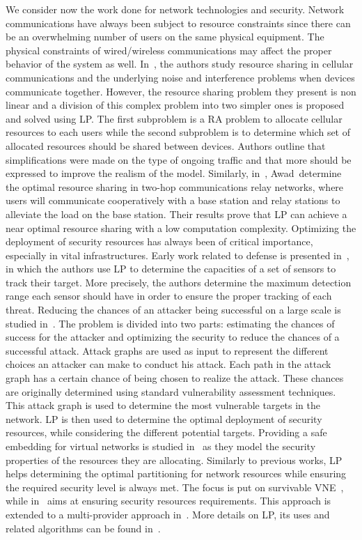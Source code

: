 We consider now the work done for network technologies and security. 
Network communications have always been subject to resource constraints since there can be an overwhelming number of users on the same physical equipment. 
The physical constraints of wired/wireless communications may affect the proper behavior of the system as well.
In~\cite{wirelessvirt-moubayed2015}, the authors study resource sharing in cellular communications and the underlying noise and interference problems when devices communicate together.
However, the resource sharing problem they present is non linear and a division of this complex problem into two simpler ones is proposed and solved using LP.
The first subproblem is a RA problem to allocate cellular resources to each users while the second subproblem is to determine which set of allocated resources should be shared between devices.
Authors outline that simplifications were made on the type of ongoing traffic and that more should be expressed to improve the realism of the model.
Similarly, in~\cite{ofdma-awad2008}, Awad~\etal determine the optimal resource sharing in two-hop communications relay networks, where users will communicate cooperatively with a base station and relay stations to alleviate the load on the base station. Their results prove that LP can achieve a near optimal resource sharing with a low computation complexity.
Optimizing the deployment of security resources has always been of critical importance, especially in vital infrastructures.
Early work related to defense is presented in~\cite{monitoring-nash1977}, in which the authors use LP to determine the capacities of a set of sensors to track their target. More precisely, the authors determine the maximum detection range each sensor should have in order to ensure the proper tracking of each threat. 
Reducing the chances of an attacker being successful on a large scale is studied in~\cite{Almohri2016}. The problem is divided into two parts: estimating the chances of success for the attacker and optimizing the security to reduce the chances of a successful attack.
Attack graphs are used as input to represent the different choices an attacker can make to conduct his attack. Each path in the attack graph has a certain chance of being chosen to realize the attack. These chances are originally determined using standard vulnerability assessment techniques.
This attack graph is used to determine the most vulnerable targets in the network.
LP is then used to determine the optimal deployment of security resources, while considering the different potential targets.
Providing a safe embedding for virtual networks is studied in~\cite{Chowdhury2016d,safevne-bays2012,Boutigny2018} as they model the security properties of the resources they are allocating. Similarly to previous works, LP helps determining the optimal partitioning for network resources while ensuring the required security level is always met.
The focus is put on survivable VNE~\cite{Chowdhury2016d}, while in~\cite{safevne-bays2012} aims at ensuring security resources requirements. This approach is extended to a multi-provider approach in~\cite{Boutigny2018}.
More details on LP, its uses and related algorithms can be found in~\cite{book-LP}.
